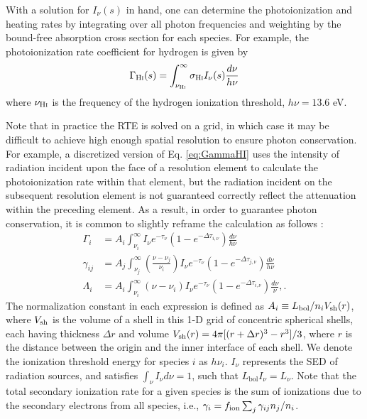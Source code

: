 With a solution for $I_{\nu}(s)$ in hand, one can determine the photoionization and heating rates by integrating over all photon frequencies and weighting by the bound-free absorption cross section for each species. For example, the photoionization rate coefficient for hydrogen is given by
\begin{equation}
	\Gamma_{\text{H} {\textsc{i}}}(s) = \int_{\nu_{\text{H} {\textsc{i}}}}^{\infty} \sigma_{\text{H} {\textsc{i}}} I_{\nu}(s) \frac{d\nu}{h\nu} \label{eq:GammaHI}
\end{equation}
where $\nu_{\text{H} {\textsc{i}}}$ is the frequency of the hydrogen ionization threshold, $h\nu=13.6$ eV.

Note that in practice the RTE is solved on a grid, in which case it may be difficult to achieve high enough spatial resolution to ensure photon conservation. For example, a discretized version of Eq. \ref{eq:GammaHI} uses the intensity of radiation incident upon the face of a resolution element to calculate the photoionization rate within that element, but the radiation incident on the subsequent resolution element is not guaranteed correctly reflect the attenuation within the preceding element. As a result, in order to guarantee photon conservation, it is common to slightly reframe the calculation as follows \cite{Abel1999}:
\begin{align}
    \Gamma_i & = A_i \int_{\nu_i}^{\infty} I_{\nu} e^{-\tau_{\nu}} \left(1 - e^{-\Delta \tau_{i,\nu}}\right) \frac{d\nu}{h\nu} \label{eq:PhotoIonizationRate} \\
    \gamma_{ij} & = A_j \int_{\nu_j}^{\infty} \left(\frac{\nu - \nu_j}{\nu_i}\right) I_{\nu} e^{-\tau_{\nu}} \left(1 - e^{-\Delta \tau_{j,\nu}}\right) \frac{d\nu}{h\nu} \label{eq:SecondaryIonizationRate} \\
    \Lambda_i & = A_i \int_{\nu_i}^{\infty} (\nu - \nu_i) I_{\nu} e^{-\tau_{\nu}} \left(1 - e^{-\Delta \tau_{i,\nu}}\right) \frac{d\nu}{\nu} , \label{eq:HeatingRate} .
\end{align}
The normalization constant in each expression is defined as $A_i \equiv L_{\mathrm{bol}}/n_i V_{\mathrm{sh}}(r)$, where $V_{\mathrm{sh}}$ is the volume of a shell in this 1-D grid of concentric spherical shells, each having thickness $\Delta r$ and volume $V_{\mathrm{sh}}(r) = 4 \pi [(r + \Delta r)^3 - r^3] / 3$, where $r$ is the distance between the origin and the inner interface of each shell. We denote the ionization threshold energy for species $i$ as $h\nu_i$. $I_{\nu}$ represents the SED of radiation sources, and satisfies $\int_{\nu} I_{\nu} d\nu = 1$, such that $L_{\mathrm{bol}} I_{\nu} = L_{\nu}$. Note that the total secondary ionization rate for a given species is the sum of ionizations due to the secondary electrons from all species, i.e., $\gamma_i = f_{\text{ion}} \sum_j \gamma_{ij} n_j / n_i$.

